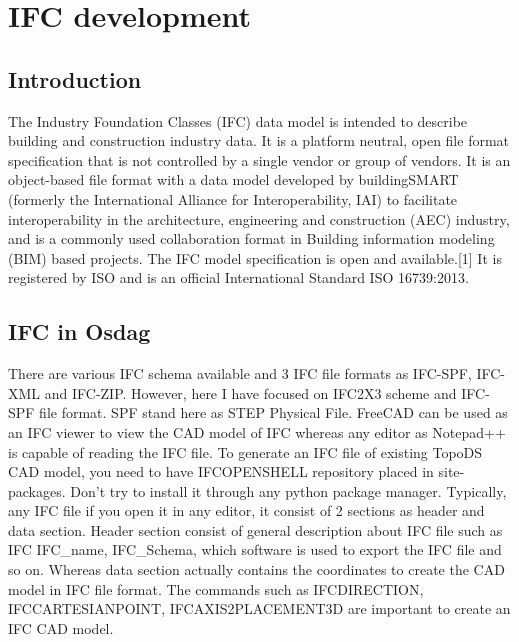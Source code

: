 \chapter{IFC development}
\section{Introduction}
The Industry Foundation Classes (IFC) data model is intended to describe building and construction industry data. It is a platform neutral, open file format specification that is not controlled by a single vendor or group of vendors. It is an object-based file format with a data model developed by buildingSMART (formerly the International Alliance for Interoperability, IAI) to facilitate interoperability in the architecture, engineering and construction (AEC) industry, and is a commonly used collaboration format in Building information modeling (BIM) based projects. The IFC model specification is open and available.[1] It is registered by ISO and is an official International Standard ISO 16739:2013.

\section{IFC in Osdag}
There are various IFC schema available and 3 IFC file formats as IFC-SPF, IFC-XML and IFC-ZIP.
However, here I have focused on IFC2X3 scheme and IFC-SPF file format. SPF stand here as STEP Physical File.
FreeCAD can be used as an IFC viewer to view the CAD model of IFC whereas any editor as Notepad++ is capable of reading the IFC file.
To generate an IFC file of existing TopoDS CAD model, you need to have IFCOPENSHELL repository placed in site-packages. Don't try to install it through any python package manager.
Typically, any IFC file if you open it in any editor, it consist of 2 sections as header and data section.
Header section consist of general description about IFC file such as IFC IFC\_name, IFC\_Schema, which software is used to export the IFC file and so on.
Whereas data section actually contains the coordinates to create the CAD model in IFC file format. The commands such as IFCDIRECTION, IFCCARTESIANPOINT, IFCAXIS2PLACEMENT3D are important to create an IFC CAD model.

